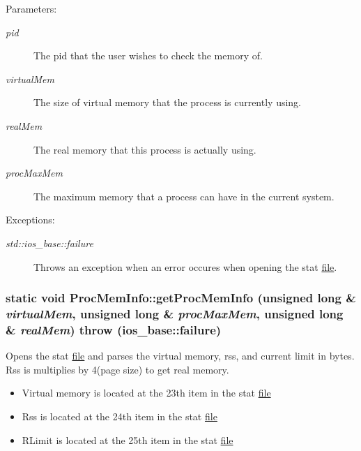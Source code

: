 \begin{Desc}
\item[Parameters:]
\begin{description}
\item[{\em pid}]The pid that the user wishes to check the memory of. \item[{\em virtualMem}]The size of virtual memory that the process is currently using. \item[{\em realMem}]The real memory that this process is actually using. \item[{\em procMaxMem}]The maximum memory that a process can have in the current system. \end{description}
\end{Desc}
\begin{Desc}
\item[Exceptions:]
\begin{description}
\item[{\em std::ios\_\-base::failure}]Throws an exception when an error occures when opening the stat \hyperlink{classfile}{file}. \end{description}
\end{Desc}
\hypertarget{classProcMemInfo_9c6c7f1557bcbde7e41911305b2f52ef}{
\subsubsection[{getProcMemInfo}]{\setlength{\rightskip}{0pt plus 5cm}static void ProcMemInfo::getProcMemInfo (unsigned long \& {\em virtualMem}, \/  unsigned long \& {\em procMaxMem}, \/  unsigned long \& {\em realMem})  throw (ios\_\-base::failure)}}
\label{classProcMemInfo_9c6c7f1557bcbde7e41911305b2f52ef}


Opens the stat \hyperlink{classfile}{file} and parses the virtual memory, rss, and current limit in bytes. Rss is multiplies by 4(page size) to get real memory.\begin{itemize}
\item Virtual memory is located at the 23th item in the stat \hyperlink{classfile}{file}\item Rss is located at the 24th item in the stat \hyperlink{classfile}{file}\item RLimit is located at the 25th item in the stat \hyperlink{classfile}{file}\end{itemize}


